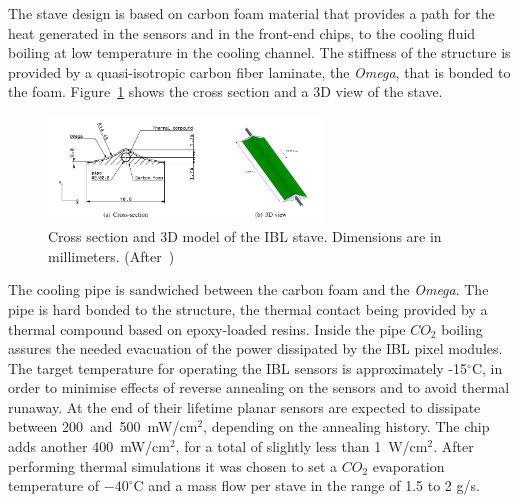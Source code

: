 The stave design is based on carbon foam material that provides a path for the heat generated in the sensors and in the front-end chips, to the cooling fluid boiling at low temperature in the cooling channel. 
The stiffness of the structure is provided by a quasi-isotropic carbon fiber laminate, the {\it Omega}, that is bonded to the foam. Figure~\ref{fig:Omega} shows the cross section and a 3D view of the stave.

\begin{figure}[!htpb]
\centering
\includegraphics[width=0.65\textwidth]{omega.png}
\caption{\label{fig:Omega}Cross section and 3D model of the IBL stave. Dimensions are in millimeters.
 (After~\cite{IBLTDR})}
\end{figure}

The cooling pipe is sandwiched between the carbon foam and the {\it Omega}. The pipe is hard bonded
to the structure, the thermal contact being provided by a thermal compound based on epoxy-loaded
resins. Inside the pipe $CO_2$ boiling assures the needed evacuation of the power dissipated 
by the IBL pixel modules. The target temperature
for operating the IBL sensors is approximately -15$^{\circ}$C, in order to minimise effects of reverse
annealing on the sensors and to avoid thermal runaway. At the end of their lifetime 
planar sensors are expected to dissipate between 200~and~500~mW/cm$^2$, depending 
on the annealing history. The chip adds another 400~mW/cm$^2$, for a total of slightly less than 
1~W/cm$^2$. After performing thermal simulations it was chosen to set a $CO_2$ evaporation 
temperature of $-40^{\circ}$C and a mass flow per stave in the range of 1.5 to 2 g/s.



